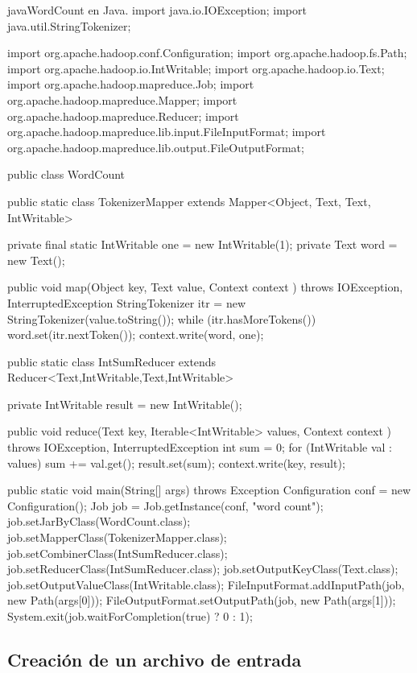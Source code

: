 \begin{sourcecode}[]{java}{WordCount en Java.}
import java.io.IOException;
import java.util.StringTokenizer;

import org.apache.hadoop.conf.Configuration;
import org.apache.hadoop.fs.Path;
import org.apache.hadoop.io.IntWritable;
import org.apache.hadoop.io.Text;
import org.apache.hadoop.mapreduce.Job;
import org.apache.hadoop.mapreduce.Mapper;
import org.apache.hadoop.mapreduce.Reducer;
import org.apache.hadoop.mapreduce.lib.input.FileInputFormat;
import org.apache.hadoop.mapreduce.lib.output.FileOutputFormat;

public class WordCount {

  public static class TokenizerMapper
       extends Mapper<Object, Text, Text, IntWritable>{

    private final static IntWritable one = new IntWritable(1);
    private Text word = new Text();

    public void map(Object key, Text value, Context context
                    ) throws IOException, InterruptedException {
      StringTokenizer itr = new StringTokenizer(value.toString());
      while (itr.hasMoreTokens()) {
        word.set(itr.nextToken());
        context.write(word, one);
      }
    }
  }

  public static class IntSumReducer
       extends Reducer<Text,IntWritable,Text,IntWritable> {
    private IntWritable result = new IntWritable();

    public void reduce(Text key, Iterable<IntWritable> values,
                       Context context
                       ) throws IOException, InterruptedException {
      int sum = 0;
      for (IntWritable val : values) {
        sum += val.get();
      }
      result.set(sum);
      context.write(key, result);
    }
  }

  public static void main(String[] args) throws Exception {
    Configuration conf = new Configuration();
    Job job = Job.getInstance(conf, "word count");
    job.setJarByClass(WordCount.class);
    job.setMapperClass(TokenizerMapper.class);
    job.setCombinerClass(IntSumReducer.class);
    job.setReducerClass(IntSumReducer.class);
    job.setOutputKeyClass(Text.class);
    job.setOutputValueClass(IntWritable.class);
    FileInputFormat.addInputPath(job, new Path(args[0]));
    FileOutputFormat.setOutputPath(job, new Path(args[1]));
    System.exit(job.waitForCompletion(true) ? 0 : 1);
  }
}
\end{sourcecode}


\subsection{Creación de un archivo de entrada}

